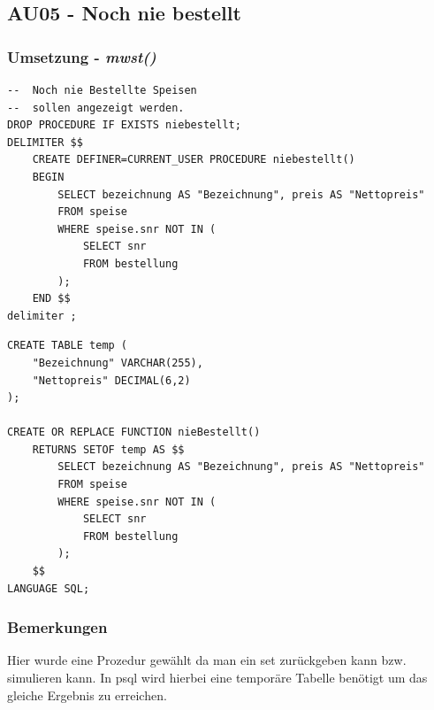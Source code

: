 \clearpage

\subsection{AU05 - Noch nie bestellt}
\subsubsection{Umsetzung - \textit{mwst()}}
\vspace{0.3cm}
\begin{minipage}{.5\textwidth}
	\begin{lstlisting}[style=sql1, caption={nochNieBestellt() - MySQL}]
--	Noch nie Bestellte Speisen
--	sollen angezeigt werden.
DROP PROCEDURE IF EXISTS niebestellt;
DELIMITER $$
	CREATE DEFINER=CURRENT_USER PROCEDURE niebestellt()
	BEGIN
		SELECT bezeichnung AS "Bezeichnung", preis AS "Nettopreis"
		FROM speise
		WHERE speise.snr NOT IN (
			SELECT snr
			FROM bestellung
		);
	END $$
delimiter ;
	\end{lstlisting}
\end{minipage}%
\begin{minipage}{.5\textwidth}
	\begin{lstlisting}[style=sql, caption={nochNieBestellt() - PSQL}]
CREATE TABLE temp (
	"Bezeichnung" VARCHAR(255),
	"Nettopreis" DECIMAL(6,2)
);

CREATE OR REPLACE FUNCTION nieBestellt() 
	RETURNS SETOF temp AS $$
		SELECT bezeichnung AS "Bezeichnung", preis AS "Nettopreis"
		FROM speise
		WHERE speise.snr NOT IN (
			SELECT snr
			FROM bestellung
		);
	$$
LANGUAGE SQL;
	\end{lstlisting}
\end{minipage}

\subsubsection{Bemerkungen}
Hier wurde eine Prozedur gewählt da man ein set zurückgeben kann bzw. simulieren kann.
In psql wird hierbei eine temporäre Tabelle benötigt um das gleiche Ergebnis zu erreichen.

